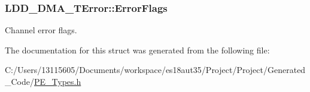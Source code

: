 \subsubsection[{Error\+Flags}]{ L\+D\+D\+\_\+\+D\+M\+A\+\_\+\+T\+Error\+::\+Error\+Flags}\label{struct_l_d_d___d_m_a___t_error_a9dd0a645e1763b4daa0058b1b29c4ad7}
Channel error flags. 

The documentation for this struct was generated from the following file\+:\begin{DoxyCompactItemize}
\item 
C\+:/\+Users/13115605/\+Documents/workspace/es18aut35/\+Project/\+Project/\+Generated\+\_\+\+Code/\hyperlink{_p_e___types_8h}{P\+E\+\_\+\+Types.\+h}\end{DoxyCompactItemize}
